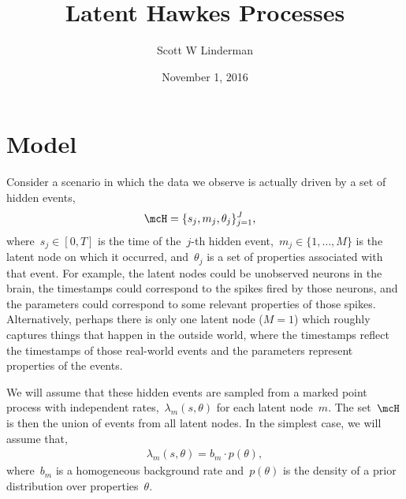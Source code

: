 


\usepackage{macros}


\title{Latent Hawkes Processes}
\author{Scott W Linderman}
\date{November 1, 2016}


\maketitle

\section{Model}
Consider a scenario in which the data we observe is actually driven by
a set of hidden events,
\begin{align}
  \mcH &= \{s_j, m_j, \theta_j\}_{j=1}^J,
\end{align}
where~$s_j \in [0,T]$ is the time of the~$j$-th hidden
event,~${m_j \in \{1, \ldots, M\}}$ is the latent node on which it
occurred, and~$\theta_j$ is a set of properties associated with that
event. For example, the latent nodes could be unobserved neurons in
the brain, the timestamps could correspond to the spikes fired by
those neurons, and the parameters could correspond to some relevant
properties of those spikes. Alternatively, perhaps there is only one
latent node ($M=1$) which roughly captures things that happen in the
outside world, where the timestamps reflect the timestamps of those
real-world events and the parameters represent properties of the
events.

We will assume that these hidden events are sampled from a
marked point process with independent rates,~$\lambda_m(s,\theta)$
for each latent node~$m$. The set~$\mcH$ is then the union of
events from all latent nodes. In the simplest case, we will assume
that,
\begin{align}
  \lambda_m(s, \theta) = b_m \cdot p(\theta),
\end{align}
where~$b_m$ is a homogeneous background rate and~$p(\theta)$ is
the density of a prior distribution over properties~$\theta$. 


